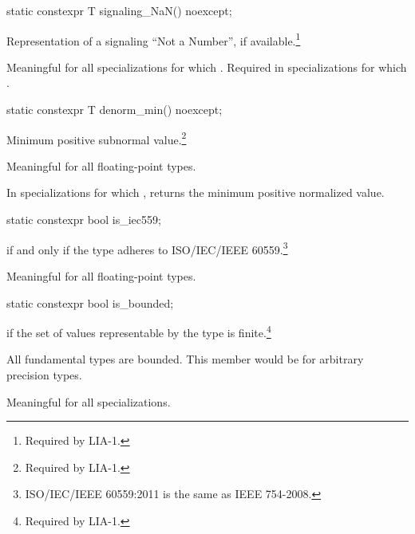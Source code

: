 %
\begin{itemdecl}
static constexpr T signaling_NaN() noexcept;
\end{itemdecl}

\begin{itemdescr}
\pnum
Representation of a signaling ``Not a Number'', if available.\footnote{Required by LIA-1.}

\pnum
Meaningful for all specializations for which
.
Required in specializations for which
.
\end{itemdescr}

%
\begin{itemdecl}
static constexpr T denorm_min() noexcept;
\end{itemdecl}

\begin{itemdescr}
%
\pnum
Minimum positive subnormal value.\footnote{Required by LIA-1.}

\pnum
Meaningful for all floating-point types.

\pnum
In specializations for which
,
returns the minimum positive normalized value.
\end{itemdescr}

%
\begin{itemdecl}
static constexpr bool is_iec559;
\end{itemdecl}

\begin{itemdescr}
\pnum
{} if and only if the type adheres to ISO/IEC/IEEE
60559.\footnote{ISO/IEC/IEEE 60559:2011 is the same as IEEE 754-2008.}

\pnum
Meaningful for all floating-point types.
\end{itemdescr}

%
\begin{itemdecl}
static constexpr bool is_bounded;
\end{itemdecl}

\begin{itemdescr}
\pnum
{} if the set of values representable by the type is finite.\footnote{Required by LIA-1.}
\begin{note} All fundamental types are bounded. This member would be  for arbitrary
precision types.\end{note}

\pnum
Meaningful for all specializations.
\end{itemdescr}

